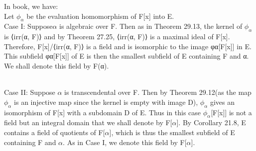 \documentclass{article}
\begin{document}
\begin{note}
    In book, we have: 
    \\Let $ \phi_\alpha$ be the evaluation homomorphism of F[x] into E.
    \\Case I:
Suppose$\alpha$ is algebraic over F. Then as in Theorem 29.13, the kernel of $\phi_\alpha$ is ⟨irr(α, F)⟩ and by Theorem 27.25, ⟨irr(α, F)⟩ is a maximal ideal of F[x]. Therefore, F[x]/⟨irr(α, F)⟩ is a field and is isomorphic to the image φα[F[x]] in E. This subfield φα[F[x]] of E is then the smallest subfield of E containing F and α. We shall denote this field by F(α).

\\Case II: 
Suppose $\alpha$ is transcendental over F. Then by Theorem 29.12(as the map $\phi_\alpha$ is an injective map since the kernel is empty with image D), $\phi_\alpha$ gives an isomorphism of F[x] with a subdomain D of E. Thus in this case $\phi_\alpha$[F[x]] is not a field but an integral domain that we shall denote by F[$\alpha$]. By Corollary 21.8, E contains a field of quotients of F[$\alpha$], which is thus the smallest subfield of E containing F and $\alpha$. As in Case I, we denote this field by F[$\alpha$].
\end{note}
\end{document}
